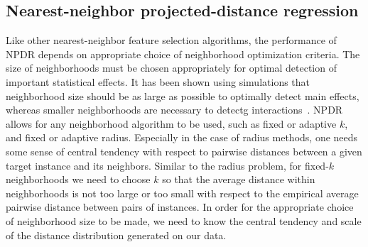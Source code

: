 \documentclass[10pt,letterpaper]{article}
\begin{document}
\subsection{Nearest-neighbor projected-distance regression}
Like other nearest-neighbor feature selection algorithms, the performance of NPDR depends on appropriate choice of neighborhood optimization criteria. The size of neighborhoods must be chosen appropriately for optimal detection of important statistical effects. It has been shown using simulations that neighborhood size should be as large as possible to optimally detect main effects, whereas smaller neighborhoods are necessary to detectg interactions~\cite{mckinney13}. NPDR allows for any neighborhood algorithm to be used, such as fixed or adaptive $k$, and fixed or adaptive radius. Especially in the case of radius methods, one needs some sense of central tendency with respect to pairwise distances between a given target instance and its neighbors. %
Similar to the radius problem, for fixed-$k$ neighborhoods we need to choose $k$ so that the average distance within neighborhoods is not too large or too small with respect to the empirical average pairwise distance between pairs of instances. In order for the appropriate choice of neighborhood size to be made, we need to know the central tendency and scale of the distance distribution generated on our data.
\end{document}
